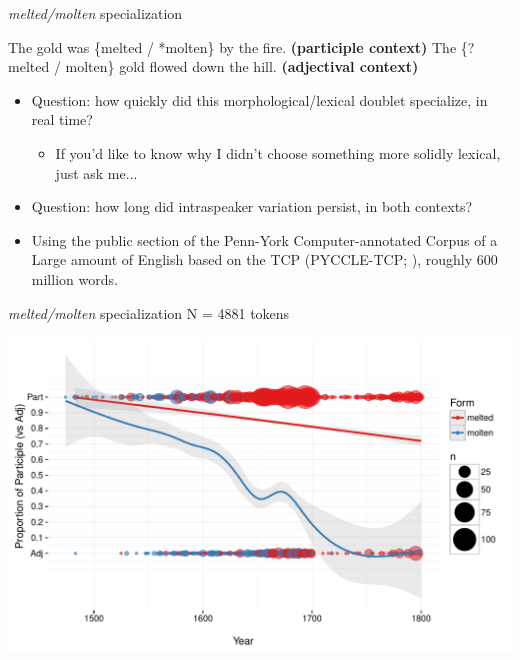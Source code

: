 \documentclass[hyperref={pdfpagelabels=false}]{beamer}
\begin{document}
\begin{frame}{\textsl{melted/molten} specialization}
\begin{exe}
	\ex The gold was \{melted / *molten\} by the fire. \textbf{(participle context)}
	\ex The \{?melted / molten\} gold flowed down the hill. \textbf{(adjectival context)}
\end{exe}
\begin{itemize}
\item Question: how quickly did this morphological/lexical doublet specialize, in real time?
\begin{itemize}
	\item If you'd like to know why I didn't choose something more solidly lexical, just ask me...
\end{itemize}
\item Question: how long did intraspeaker variation persist, in both contexts?
\item Using the public section of the {P}enn-{Y}ork {C}omputer-annotated {C}orpus of a {L}arge amount of {E}nglish based on the {TCP (PYCCLE-TCP; \citealt{pycxle})}, roughly 600 million words.
\end{itemize}
\end{frame}


\begin{frame}{\textsl{melted/molten} specialization N =  4881 tokens}

\begin{center}
\includegraphics[width=1.1\textwidth]{ContextByDateUnbinnedWithDots2.pdf}
\end{center}
\end{frame}
\end{document}
